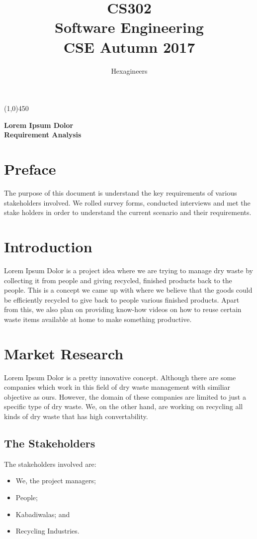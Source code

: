 \documentclass{article}
\title{\textbf{CS302}\\\HUGE Software Engineering\\
\LARGE CSE\hspace{\labelsep}\textbullet\hspace{\labelsep} Autumn 2017
}
\author{Hexagineers}
\begin{document}
\maketitle
\line(1,0){450}

\begin{center}
\textbf{\Huge Lorem Ipsum Dolor\\\Large Requirement Analysis}

\end{center}
\newpage
\tableofcontents
\newpage
\section{Preface}
\par The purpose of this document is understand the key requirements of various stakeholders involved. We rolled survey forms, conducted interviews and met the stake holders in order to understand the current scenario and their requirements. 
\newpage
\section{Introduction}
\par Lorem Ipsum Dolor is a project idea where we are trying to manage dry waste by collecting it from people and giving recycled, finished products back to the people. This is a concept we came up with where we believe that the goods could be efficiently recycled to give back to people various finished products. 
Apart from this, we also plan on providing know-how videos on how to reuse certain waste items available at home to make something productive.

\section{Market Research}
\par Lorem Ipsum Dolor is a pretty innovative concept. Although there are some companies which work in this field of dry waste management with similiar objective as ours. However, the domain of these companies are limited to just a specific type of dry waste.
We, on the other hand, are working on recycling all kinds of dry waste that has high convertability. 

\subsection{The Stakeholders}
\par The stakeholders involved are:
\begin{itemize}
    \item We, the project managers;
    \item People;
    \item Kabadiwalas; and
    \item Recycling Industries.
\end{itemize}
\end{document}
